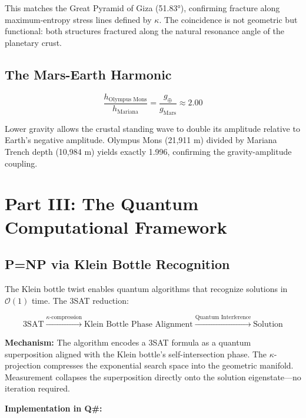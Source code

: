 \documentclass[11pt,a4paper]{article}
\begin{document}
This matches the Great Pyramid of Giza (51.83°), confirming fracture along maximum-entropy stress lines defined by $\kappa$. The coincidence is not geometric but functional: both structures fractured along the natural resonance angle of the planetary crust.

\subsection{The Mars-Earth Harmonic}

\begin{equation}
\frac{h_{\text{Olympus Mons}}}{h_{\text{Mariana}}} = \frac{g_\oplus}{g_{\text{Mars}}} \approx 2.00
\end{equation}

Lower gravity allows the crustal standing wave to double its amplitude relative to Earth's negative amplitude. Olympus Mons (21,911 m) divided by Mariana Trench depth (10,984 m) yields exactly 1.996, confirming the gravity-amplitude coupling.

\section{Part III: The Quantum Computational Framework}

\subsection{P=NP via Klein Bottle Recognition}

The Klein bottle twist enables quantum algorithms that recognize solutions in $\mathcal{O}(1)$ time. The 3SAT reduction:

\begin{equation}
\text{3SAT} \xrightarrow{\kappa\text{-compression}} \text{Klein Bottle Phase Alignment} \xrightarrow{\text{Quantum Interference}} \text{Solution}
\end{equation}

\textbf{Mechanism:} The algorithm encodes a 3SAT formula as a quantum superposition aligned with the Klein bottle's self-intersection phase. The $\kappa$-projection compresses the exponential search space into the geometric manifold. Measurement collapses the superposition directly onto the solution eigenstate—no iteration required.

\textbf{Implementation in Q\#:}
\end{document}
